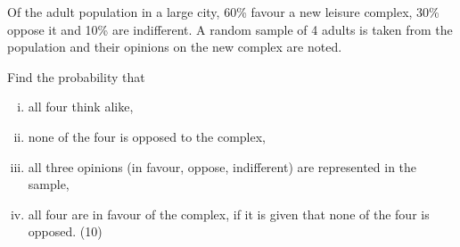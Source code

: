 \documentclass[a4paper,12pt]{article}
\begin{document}
Of the adult population in a large city, 60\% favour a new leisure complex, 30\% oppose it and 10\% are indifferent.  A random sample of 4 adults is taken from the population and their opinions on the new complex are noted. 
 
\begin{framed} 
Find the probability that 

\begin{enumerate}[(i)]
\item all four think alike, 
\item  none of the four is opposed to the complex, 
\item all three opinions (in favour, oppose, indifferent) are represented in the sample, 
\item  all four are in favour of the complex, if it is given that none of the four is opposed. (10) 
\end{enumerate} 
\end{framed} 

 
 
\end{document}
